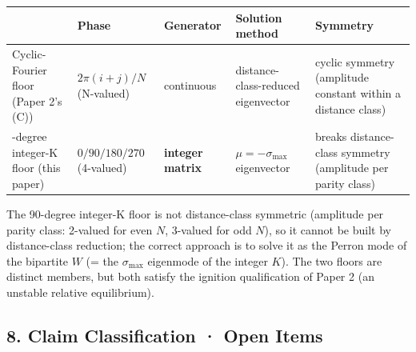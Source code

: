 \documentclass[
  a4paper,
]{ltjsarticle}
\newcounter{none} %
\begin{document}
{\def\LTcaptype{none} %
\begin{longtable}[]{@{}
  >{\raggedright\arraybackslash}p{}
  >{\raggedright\arraybackslash}p{}
  >{\raggedright\arraybackslash}p{}
  >{\raggedright\arraybackslash}p{}
  >{\raggedright\arraybackslash}p{}@{}}
\toprule\noalign{}
\begin{minipage}[b]{\linewidth}\raggedright
\end{minipage} & \begin{minipage}[b]{\linewidth}\raggedright
Phase
\end{minipage} & \begin{minipage}[b]{\linewidth}\raggedright
Generator
\end{minipage} & \begin{minipage}[b]{\linewidth}\raggedright
Solution method
\end{minipage} & \begin{minipage}[b]{\linewidth}\raggedright
Symmetry
\end{minipage} \\
\midrule\noalign{}
\endhead
\bottomrule\noalign{}
\endlastfoot
Cyclic-Fourier floor (Paper 2's (C)) & \(2\pi(i+j)/N\) (N-valued) &
continuous & distance-class-reduced eigenvector & cyclic symmetry
(amplitude constant within a distance class) \\
90-degree integer-K floor (this paper) & \(0/90/180/270\) (4-valued) &
\textbf{integer matrix} & \(\mu=-\sigma_{\max}\) eigenvector & breaks
distance-class symmetry (amplitude per parity class) \\
\end{longtable}
}

The 90-degree integer-K floor is not distance-class symmetric (amplitude
per parity class: 2-valued for even \(N\), 3-valued for odd \(N\)), so
it cannot be built by distance-class reduction; the correct approach is
to solve it as the Perron mode of the bipartite \(W\) (= the
\(\sigma_{\max}\) eigenmode of the integer \(K\)). The two floors are
distinct members, but both satisfy the ignition qualification of Paper 2
(an unstable relative equilibrium).

\subsection{8. Claim Classification · Open
Items}\label{claim-classification-open-items}
\end{document}
